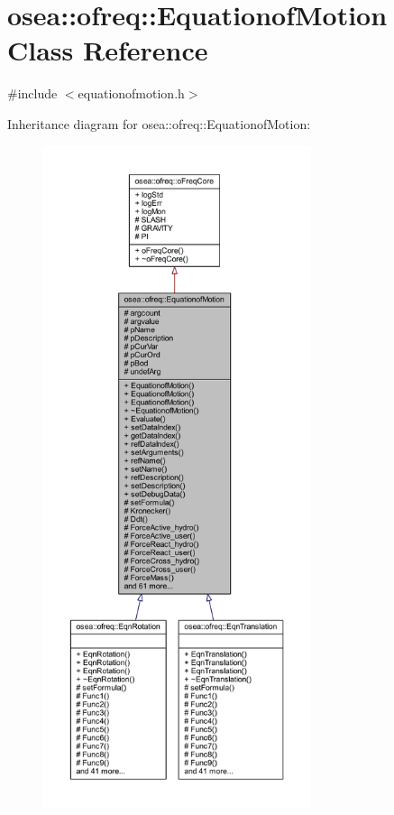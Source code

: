 \hypertarget{classosea_1_1ofreq_1_1_equationof_motion}{\section{osea\-:\-:ofreq\-:\-:Equationof\-Motion Class Reference}
\label{classosea_1_1ofreq_1_1_equationof_motion}
}


{\ttfamily \#include $<$equationofmotion.\-h$>$}



Inheritance diagram for osea\-:\-:ofreq\-:\-:Equationof\-Motion\-:
\nopagebreak
\begin{figure}[H]
\begin{center}
\leavevmode
\includegraphics[height=550pt]{classosea_1_1ofreq_1_1_equationof_motion__inherit__graph}
\end{center}
\end{figure}
